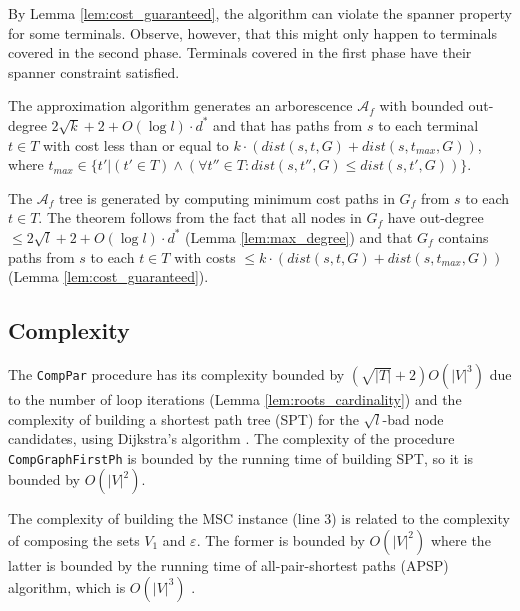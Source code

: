 By Lemma \ref{lem:cost_guaranteed}, the algorithm can violate the spanner property for some terminals. Observe, however, that this might only happen
to terminals covered in the second phase. Terminals covered in the first phase have their spanner constraint satisfied.

\begin{Theo}
  \label{teorema:final_theorem}
  The approximation algorithm generates an arborescence $\mathcal{A}_f$ with bounded out-degree $2\sqrt{k} + 2 + O(\log l) \cdot d^*$ and that 
has paths from $s$ to each terminal $t \in T$ with cost less than or equal to $k \cdot ( dist(s,t,G) + dist(s,t_{max},G))$, 
where $t_{max} \in \{t' | 
(t' \in T) \land (\forall t'' \in T : dist(s,t'',G) \le dist(s,t',G))\}$.
\end{Theo}
  \begin{Proof}
The $\mathcal{A}_f$ tree is generated by computing minimum cost paths in $G_f$ from $s$ to each $t \in T$. The theorem follows from the fact that
all nodes in $G_f$ have out-degree $\le 2\sqrt{l} + 2 + O(\log l) \cdot d^*$ (Lemma \ref{lem:max_degree}) and that $G_f$ contains paths from $s$ to each $t \in T$ 
with costs $\le k \cdot ( dist(s,t,G) + dist(s,t_{max},G))$ (Lemma \ref{lem:cost_guaranteed}).
  \end{Proof}


\subsection{Complexity}

The \verb|CompPar| procedure has its complexity bounded by $(\sqrt{|T|} + 2)O(|V|^3)$ due to the number of loop iterations (Lemma \ref{lem:roots_cardinality}) and 
the complexity of building a shortest path tree (SPT) for the $\sqrt{l}$-bad node candidates, using Dijkstra's algorithm \cite{Cormen2009}. The complexity of the procedure \verb|CompGraphFirstPh| 
is bounded by the running time of building SPT, so it is bounded by $O(|V|^2)$.

The complexity of building the MSC instance (line 3) is related to the complexity of composing the sets $V_1$ and $\varepsilon$. 
The former is bounded by $O(|V|^2)$ 
where the latter is bounded by the running time of all-pair-shortest paths (APSP) algorithm, which is $O(|V|^3)$ \cite{Cormen2009}.

